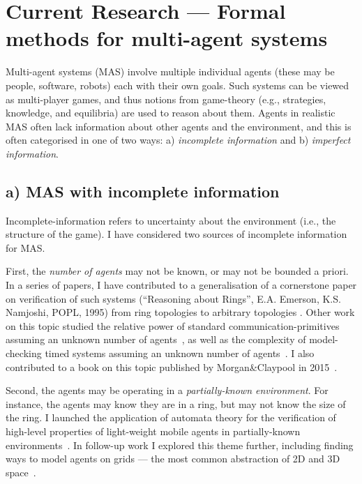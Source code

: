 \documentclass[10pt,a4paper,sans]{moderncv}
\begin{document}
\section{Current Research --- Formal methods for multi-agent systems}
Multi-agent systems (MAS) involve multiple individual agents (these may be people, software, robots) each with their own goals. Such systems can be viewed as multi-player games, and thus notions from game-theory (e.g., strategies, knowledge, and equilibria) are used to reason about them. Agents in realistic MAS often lack information about other agents and the environment, and this is often categorised in one of two ways: a) \emph{incomplete information} and b) \emph{imperfect information}.
\newline

\subsection{a) MAS with incomplete information}
Incomplete-information refers to uncertainty about the environment (i.e., the structure of the game). I have considered two sources of incomplete information for MAS.
\newline


First, the \emph{number of agents} may not be known, or may not be bounded a priori.
In a series of papers, I have contributed to a generalisation of a cornerstone paper on verification of such systems (``Reasoning about Rings'', E.A. Emerson, K.S. Namjoshi, 
\textsc{POPL}, 1995) from ring topologies to arbitrary topologies \cite{DBLP:conf/vmcai/AminofJKR14,DBLP:conf/concur/AminofKRSV14,DBLP:conf/cade/AminofR16,AKRSV17}. Other work on this topic 
studied the relative power of standard communication-primitives assuming an unknown number of agents~\cite{DBLP:conf/lpar/AminofRZ15}, as well as the complexity of model-checking timed systems assuming an unknown number of agents~\cite{DBLP:conf/icalp/AminofRZS15}. I also contributed to a book on this topic published by Morgan\&Claypool in 2015~\cite{DBLP:series/synthesis/2015Bloem,DBLP:journals/sigact/BloemJKKRVW16}.
\newline



Second, the agents may be operating in a \emph{partially-known environment}. For instance, the agents may know they are in a ring, but may not know the size of the ring. I launched the application of automata theory for the verification of high-level properties of light-weight mobile agents in partially-known environments~\cite{DBLP:conf/atal/Rubin15}. In follow-up work I explored this theme further, including finding ways to model agents on grids --- the most common abstraction of 2D and 3D space~\cite{DBLP:conf/prima/RubinZMA15,DBLP:conf/atal/AminofMRZ16,DBLP:conf/prima/MuranoPR15}.
\newline  
\end{document}
